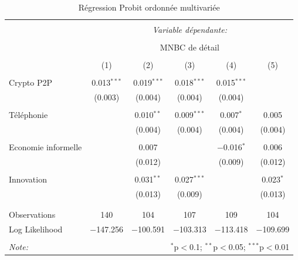 \documentclass[12pt]{article}
\begin{document}
\FloatBarrier

\begin{table}[!htbp] \centering 
  \caption{Régression Probit ordonnée multivariée}
\begin{tabular}{@{\extracolsep{5pt}}lccccc} 
\\[-1.8ex]\hline 
\hline \\[-1.8ex] 
 & \multicolumn{5}{c}{\textit{Variable dépendante:}} \\ 
\cline{2-6} 
\\[-1.8ex] & \multicolumn{5}{c}{MNBC de détail} \\ 
\\[-1.8ex] & (1) & (2) & (3) & (4) & (5)\\ 
\hline \\[-1.8ex] 
Crypto P2P & 0.013$^{***}$ & 0.019$^{***}$ & 0.018$^{***}$ & 0.015$^{***}$ &  \\ 
  & (0.003) & (0.004) & (0.004) & (0.004) &  \\ 
  & & & & & \\ 
 Téléphonie &  & 0.010$^{**}$ & 0.009$^{***}$ & 0.007$^{*}$ & 0.005 \\ 
  &  & (0.004) & (0.004) & (0.004) & (0.004) \\ 
  & & & & & \\ 
 Economie informelle &  & 0.007 &  & $-$0.016$^{*}$ & 0.006 \\ 
  &  & (0.012) &  & (0.009) & (0.012) \\ 
  & & & & & \\ 
 Innovation &  & 0.031$^{**}$ & 0.027$^{***}$ &  & 0.023$^{*}$ \\ 
  &  & (0.013) & (0.009) &  & (0.013) \\ 
  & & & & & \\ 
\hline \\[-1.8ex] 
Observations & 140 & 104 & 107 & 109 & 104 \\ 
Log Likelihood & $-$147.256 & $-$100.591 & $-$103.313 & $-$113.418 & $-$109.699 \\ 
\hline 
\hline \\[-1.8ex] 
\textit{Note:}  & \multicolumn{5}{r}{$^{*}$p$<$0.1; $^{**}$p$<$0.05; $^{***}$p$<$0.01} \\ 
\end{tabular} 
\label{tab:Regression Probit ordonné multivarié}
\end{table} 
\end{document}

